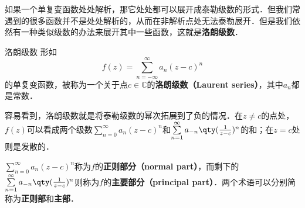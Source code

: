 

如果一个单复变函数处处解析，那它处处都可以展开成泰勒级数的形式．但我们常遇到的很多函数并不是处处解析的，从而在非解析点处无法泰勒展开．但是我们依然有一种类似级数的办法来展开其中一些函数，这就是\textbf{洛朗级数}．

\begin{definition}{洛朗级数}
形如
\begin{equation}
f(z)=\sum\limits_{n=-\infty}^{\infty} a_n(z-c)^n
\end{equation}
的单复变函数，被称为一个关于点$c\in\mathbb{C}$的\textbf{洛朗级数（Laurent series）}，其中$a_n$都是常数．


\end{definition}

容易看到，洛朗级数就是将泰勒级数的幂次拓展到了负的情况．在$z\neq c$的点处，$f(z)$可以看成两个级数$\sum\limits_{n=0}^{\infty} a_n(z-c)^n$和$\sum\limits_{n=1}^{\infty} a_{-n}\qty(\frac{1}{z-c})^n$的和；在$z=c$处则是发散的．

$\sum\limits_{n=0}^{\infty} a_n(z-c)^n$称为$f$的\textbf{正则部分（normal part）}，而剩下的$\sum\limits_{n=1}^{\infty} a_{-n}\qty(\frac{1}{z-c})^n$则称为$f$的\textbf{主要部分（principal part）}．两个术语可以分别简称为\textbf{正则部}和\textbf{主部}．



















